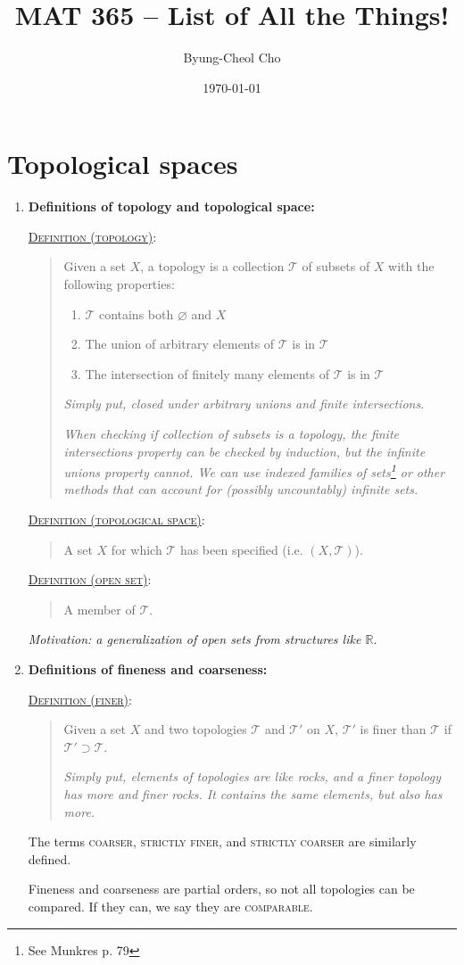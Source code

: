 \documentclass[letterpaper, 12pt]{article}
\title{MAT 365 -- List of All the Things!}
\author{Byung-Cheol Cho}
\date{\today}
\newcommand{\RR}{\mathbb{R}}
\newcommand{\ms}[1]{\mathscr{#1}}
\newcommand{\defn}[2]{\textsc{\underline{Definition (#1)}:}\begin{quote} #2\end{quote}}
\let\emptyset\varnothing
\begin{document}
\maketitle

\section{Topological spaces}
    \begin{enumerate}
    \item \textbf{Definitions of topology and topological space:}

        \defn{topology}{Given a set $X$, a topology is a collection $\ms{T}$ of subsets of $X$ with the following properties:
        \begin{enumerate}
            \item $\ms{T}$ contains both $\emptyset$ and $X$
            \item The union of arbitrary elements of $\ms{T}$ is in $\ms{T}$
            \item The intersection of finitely many elements of $\ms{T}$ is in $\ms{T}$
        \end{enumerate}
        \textit{Simply put, closed under arbitrary unions and finite intersections.}

        \textit{When checking if collection of subsets is a topology, the finite intersections property can be checked by induction, but the infinite unions property cannot. We can use indexed families of sets\footnote{See Munkres p. 79} or other methods that can account for (possibly uncountably) infinite sets.}
        }
        \defn{topological space}{A set $X$ for which $\ms{T}$ has been specified (i.e. $(X, \ms{T})$).}
        \defn{open set}{A member of $\ms{T}$.}
        \textit{Motivation: a generalization of open sets from structures like $\RR$.}
    \item \textbf{Definitions of fineness and coarseness:}

        \defn{finer}{Given a set $X$ and two topologies $\ms{T}$ and $\ms{T'}$ on $X$, $\ms{T'}$ is finer than $\ms{T}$ if $\ms{T'}\supset\ms{T}$.\par\textit{Simply put, elements of topologies are like rocks, and a finer topology has more and finer rocks. It contains the same elements, but also has more.}}
        The terms \textsc{coarser}, \textsc{strictly finer}, and \textsc{strictly coarser} are similarly defined.

        Fineness and coarseness are partial orders, so not all topologies can be compared. If they can, we say they are \textsc{comparable}.
    \end{enumerate}
\end{document}

